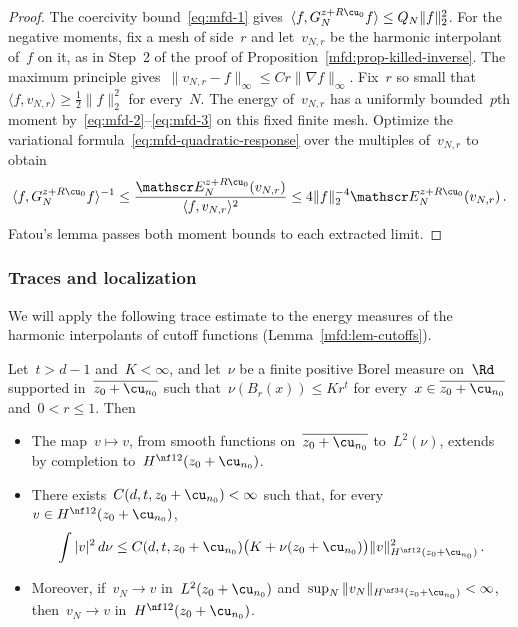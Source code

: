 \documentclass[11pt]{amsart}
\begin{document}
\begin{proof}
The coercivity bound~\eqref{eq:mfd-1} gives~$\langle f,G_N^{z+R\cu_0}f\rangle\leq Q_N\|f\|_2^2$. For the negative moments, fix a mesh of side~$r$ and let~$v_{N,r}$ be the harmonic interpolant of~$f$ on it, as in Step~2 of the proof of Proposition~\ref{mfd:prop-killed-inverse}. The maximum principle gives~$\|v_{N,r}-f\|_\infty\leq Cr\|\nabla f\|_\infty$. Fix~$r$ so small that~$\langle f,v_{N,r}\rangle\geq\frac{1}{2}\|f\|_2^2$ for every~$N$. The energy of~$v_{N,r}$ has a uniformly bounded~$p$th moment by~\eqref{eq:mfd-2}--\eqref{eq:mfd-3} on this fixed finite mesh. Optimize the variational formula~\eqref{eq:mfd-quadratic-response} over the multiples of~$v_{N,r}$ to obtain
\begin{equation*}
	\langle f,G_N^{z+R\cu_0}f\rangle^{-1}\leq\frac{\mathscr E_N^{z+R\cu_0}(v_{N,r})}{\langle f,v_{N,r}\rangle^2}
	\leq4\|f\|_2^{-4}\mathscr E_N^{z+R\cu_0}(v_{N,r})\,.
\end{equation*}
Fatou's lemma passes both moment bounds to each extracted limit.
\end{proof}

\subsubsection{Traces and localization}

We will apply the following trace estimate to the energy measures of the harmonic interpolants of cutoff functions (Lemma~\ref{mfd:lem-cutoffs}).

\begin{lemma}
\label{mfd:lem-19}
Let~$t>d-1$ and~$K<\infty$, and let~$\nu$ be a finite positive Borel measure on~$\Rd$ supported in~$\overline{z_0+\cu_{n_0}}$ such that~$\nu(B_r(x))\leq Kr^t$ for every~$x\in\overline{z_0+\cu_{n_0}}$ and~$0<r\leq1$. Then
\begin{itemize}
\item The map~$v\mapsto v$, from smooth functions on~$\overline{z_0+\cu_{n_0}}$ to~$L^2(\nu)$, extends by completion to~$H^{\nf12}(z_0+\cu_{n_0})$.
\item There exists~$C(d,t,z_0+\cu_{n_0})<\infty$ such that, for every~$v\in H^{\nf12}(z_0+\cu_{n_0})$,
\begin{equation}
	\int|v|^2\,d\nu\leq C(d,t,z_0+\cu_{n_0})\bigl(K+\nu(z_0+\cu_{n_0})\bigr)\|v\|_{H^{\nf12}(z_0+\cu_{n_0})}^2\,.
	\label{eq:mfd-19}
\end{equation}
\item Moreover, if~$v_N\to v$ in~$L^2(z_0+\cu_{n_0})$ and~$\sup_N\|v_N\|_{H^{\nf34}(z_0+\cu_{n_0})}<\infty$, then~$v_N\to v$ in~$H^{\nf12}(z_0+\cu_{n_0})$.
\end{itemize}
\end{lemma}
\end{document}
